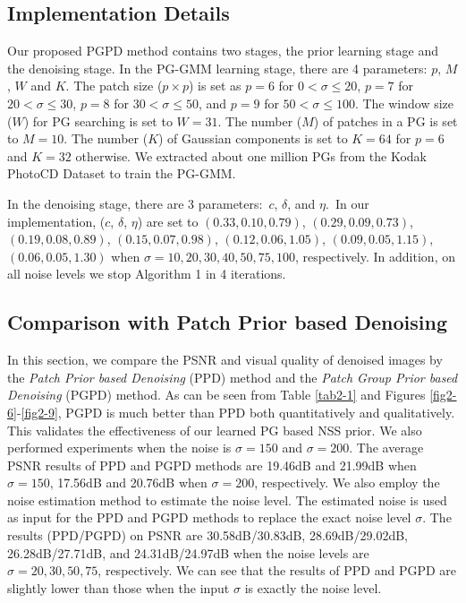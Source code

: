 \subsection{Implementation Details}
Our proposed PGPD method contains two stages, the prior learning stage and the denoising stage. In the PG-GMM learning stage, there are 4 parameters: $p$, $M$, $W$ and $K$. The patch size ($p\times p$) is set as $p = 6$ for $0 < \sigma \le 20$, $p = 7$ for $20 < \sigma \le 30$, $p = 8$ for $30 < \sigma \le 50$, and $p=9$ for $50 < \sigma \le 100$. The window size ($W$) for PG searching is set to $W = 31$. The number ($M$) of patches in a PG is set to $M=10$. The number ($K$) of Gaussian components is set to $K=64$ for $p=6$ and $K=32$ otherwise. We extracted about one million PGs from the Kodak PhotoCD Dataset to train the PG-GMM. 

In the denoising stage, there are 3 parameters:\ $c$, $\delta$, and $\eta$.\ In our implementation, ($c$, $\delta$, $\eta$) are set to $(0.33,0.10,0.79)$, $(0.29,0.09,0.73)$, $(0.19,0.08,0.89)$, $(0.15,0.07,0.98)$, $(0.12,0.06,1.05)$, $(0.09,0.05,1.15)$, $(0.06,0.05,1.30)$ when $\sigma=10,20,30,40,50,75,100$, respectively. In addition, on all noise levels we stop Algorithm 1 in 4 iterations.

\subsection{Comparison with Patch Prior based Denoising}
In this section, we compare the PSNR and visual quality of denoised images by the \textsl{Patch Prior based Denoising} (PPD) method and the \textsl{Patch Group Prior based Denoising} (PGPD) method. As can be seen from Table \ref{tab2-1} and Figures \ref{fig2-6}-\ref{fig2-9}, PGPD is much better than PPD both quantitatively and qualitatively. This validates the effectiveness of our learned PG based NSS prior. We also performed experiments when the noise is $\sigma=150$ and $\sigma=200$. The average PSNR results of PPD and PGPD methods are 19.46dB and 21.99dB when $\sigma=150$, 17.56dB and 20.76dB when $\sigma=200$, respectively. We also employ the noise estimation method \cite{Chen2015ICCV} to estimate the noise level. The estimated noise is used as input for the PPD and PGPD methods to replace the exact noise level $\sigma$. The results (PPD/PGPD) on PSNR are 30.58dB/30.83dB, 28.69dB/29.02dB, 26.28dB/27.71dB, and 24.31dB/24.97dB when the noise levels are $\sigma=20,30,50,75$, respectively. We can see that the results of PPD and PGPD are slightly lower than those when the input $\sigma$ is exactly the noise level.

